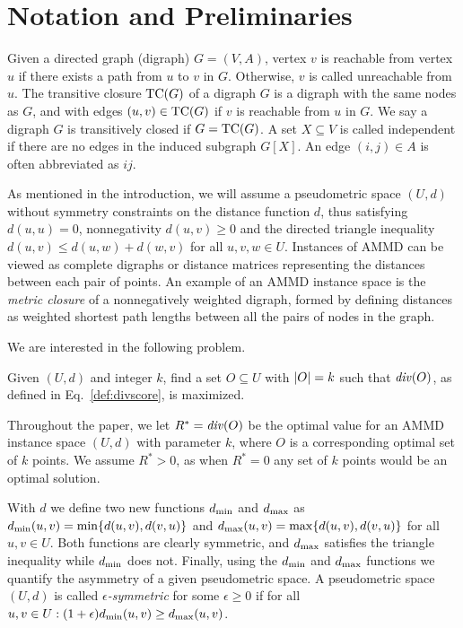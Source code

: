 \section{Notation and Preliminaries}
\label{sec:notation}
Given a directed graph (digraph) $G=(V, A)$, vertex $v$ is reachable from vertex $u$ if there exists a path from $u$ to $v$ in $G$. Otherwise, $v$ is called unreachable from $u$. The transitive closure $\text{TC}(G)$ of a digraph $G$ is a digraph with the same nodes as $G$, and with edges $(u,v) \in \text{TC}(G)$ if $v$ is reachable from $u$ in $G$.
We say a digraph $G$ is transitively closed if $G=\text{TC}(G)$.
A set $X \subseteq V$ is called independent if there are no edges in the induced subgraph $G[X]$.
An edge $(i,j) \in A$ is often abbreviated as $ij$.

As mentioned in the introduction, we will assume a pseudometric space $(U,d)$ without symmetry constraints on the distance function $d$, thus satisfying $d(u,u)=0$, nonnegativity $d(u,v) \geq 0$ and the directed triangle inequality $d(u,v) \leq d(u,w)+d(w,v)$ for all $u,v,w \in U$. Instances of AMMD can be viewed as complete digraphs or distance matrices representing the distances between each pair of points. An example of an AMMD instance space is the
\emph{metric closure} of a nonnegatively weighted digraph, formed by defining distances as weighted shortest path lengths between all the pairs of nodes in the graph.

We are interested in the following problem.
\begin{prob}[AMMD]
\label{prob:ammd}
Given $(U, d)$ and integer $k$, find a set $O \subseteq U$ with ${\left|O\right|} = k$ such that $\diver{O}$, as defined in Eq.~\ref{def:divscore}, is maximized.
\end{prob}
Throughout the paper, we let $R^* = \diver{O}$ be the optimal value for an AMMD instance space $(U,d)$ with parameter $k$, where $O$ is a corresponding optimal set of $k$ points. We assume $R^* > 0$, as when $R^*=0$ any set of $k$ points would be an optimal solution.


With $d$ we define two new functions $d_{\text{min}}$ and $d_{\text{max}}$ as $d_{\text{min}}(u,v) = \min\{d(u,v), d(v,u)\}$ and $d_{\text{max}}(u,v) = \max\{d(u,v), d(v,u)\}$ for all $u,v \in U$. Both functions are clearly symmetric, and $d_{\text{max}}$ satisfies the triangle inequality while $d_{\text{min}}$ does not. Finally, using the $d_{\text{min}}$ and $d_{\text{max}} $ functions we quantify the asymmetry of a given pseudometric space. A pseudometric space $(U, d)$ is called \emph{$\epsilon$-symmetric} for some $\epsilon \geq 0$ if for all $u,v \in U: (1+\epsilon)d_{\text{min}}(u,v) \geq d_{\text{max}}(u,v)$.





